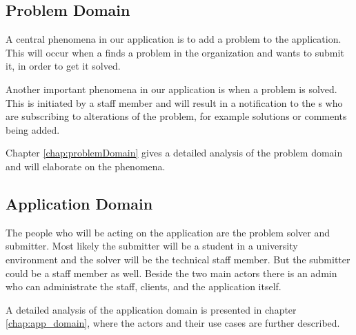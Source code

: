 \subsection{Problem Domain}
A central phenomena in our application is to add a problem to the application.
This will occur when a \aclient[] finds a problem in the organization and wants to submit it, in order to get it solved.

Another important phenomena in our application is when a problem is solved.
This is initiated by a staff member and will result in a notification to the \aclient s who are subscribing to alterations of the problem, for example solutions or comments being added.

Chapter \ref{chap:problemDomain} gives a detailed analysis of the problem domain and will elaborate on the phenomena.

\subsection{Application Domain}
The people who will be acting on the application are the problem solver and submitter. Most likely the submitter will be a student in a university environment and the solver will be the technical staff member. But the submitter could be a staff member as well. Beside the two main actors there is an admin who can administrate the staff, clients, and the application itself.

A detailed analysis of the application domain is presented in chapter \ref{chap:app_domain}, where the actors and their use cases are further described.